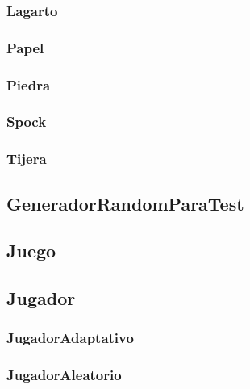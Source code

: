 \documentclass[a4paper, 10pt, twoside]{article}
\begin{document}
    \subsubsection{Lagarto}
    

    \subsubsection{Papel}
    

    \subsubsection{Piedra}
    

    \subsubsection{Spock}
    

    \subsubsection{Tijera}
    

\subsection{GeneradorRandomParaTest}


\subsection{Juego}


\subsection{Jugador}


    \subsubsection{JugadorAdaptativo}
    

    \subsubsection{JugadorAleatorio}
    
\end{document}
